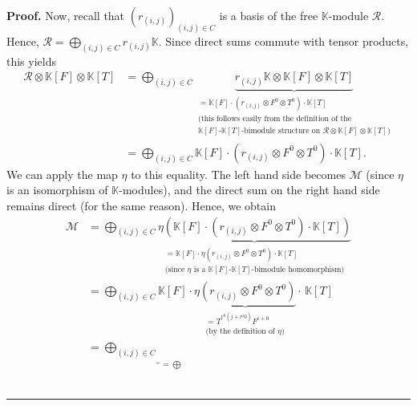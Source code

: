 \documentclass[numbers=enddot,12pt,final,onecolumn,notitlepage]{scrartcl}%
\theoremstyle{definition}
\newenvironment{proof}[1][Proof]{\noindent\textbf{#1.} }{\ \rule{0.5em}{0.5em}}
\begin{document}
\begin{proof}
Now, recall that $\left(  r_{\left(  i,j\right)  }\right)  _{\left(
i,j\right)  \in C}$ is a basis of the free $\mathbb{K}$-module $\mathcal{R}$.
Hence, $\mathcal{R}=\bigoplus_{\left(  i,j\right)  \in C}r_{\left(
i,j\right)  }\mathbb{K}$. Since direct sums commute with tensor products, this
yields%
\begin{align*}
\mathcal{R}\otimes\mathbb{K}\left[  F\right]  \otimes\mathbb{K}\left[
T\right]   &  =\bigoplus_{\left(  i,j\right)  \in C}\underbrace{r_{\left(
i,j\right)  }\mathbb{K}\otimes\mathbb{K}\left[  F\right]  \otimes
\mathbb{K}\left[  T\right]  }_{\substack{=\mathbb{K}\left[  F\right]
\cdot\left(  r_{\left(  i,j\right)  }\otimes F^{0}\otimes T^{0}\right)
\cdot\mathbb{K}\left[  T\right]  \\\text{(this follows easily from the
definition of the}\\\mathbb{K}\left[  F\right]  \text{-}\mathbb{K}\left[
T\right]  \text{-bimodule structure on }\mathcal{R}\otimes\mathbb{K}\left[
F\right]  \otimes\mathbb{K}\left[  T\right]  \text{)}}}\\
&  =\bigoplus_{\left(  i,j\right)  \in C}\mathbb{K}\left[  F\right]
\cdot\left(  r_{\left(  i,j\right)  }\otimes F^{0}\otimes T^{0}\right)
\cdot\mathbb{K}\left[  T\right]  .
\end{align*}
We can apply the map $\eta$ to this equality. The left hand side becomes
$\mathcal{M}$ (since $\eta$ is an isomorphism of $\mathbb{K}$-modules), and
the direct sum on the right hand side remains direct (for the same reason).
Hence, we obtain%
\begin{align*}
\mathcal{M}  &  =\bigoplus_{\left(  i,j\right)  \in C}\underbrace{\eta\left(
\mathbb{K}\left[  F\right]  \cdot\left(  r_{\left(  i,j\right)  }\otimes
F^{0}\otimes T^{0}\right)  \cdot\mathbb{K}\left[  T\right]  \right)
}_{\substack{=\mathbb{K}\left[  F\right]  \cdot\eta\left(  r_{\left(
i,j\right)  }\otimes F^{0}\otimes T^{0}\right)  \cdot\mathbb{K}\left[
T\right]  \\\text{(since }\eta\text{ is a }\mathbb{K}\left[  F\right]
\text{-}\mathbb{K}\left[  T\right]  \text{-bimodule homomorphism)}}}\\
&  =\bigoplus_{\left(  i,j\right)  \in C}\mathbb{K}\left[  F\right]
\cdot\underbrace{\eta\left(  r_{\left(  i,j\right)  }\otimes F^{0}\otimes
T^{0}\right)  }_{\substack{=T^{r^{0}\left(  j+r^{i}0\right)  }F^{i+0}%
\\\text{(by the definition of }\eta\text{)}}}\cdot\,\mathbb{K}\left[  T\right]
\\
&  =\underbrace{\bigoplus_{\left(  i,j\right)  \in C}}_{=\bigoplus
}
\end{align*}
\end{proof}
\end{document}
